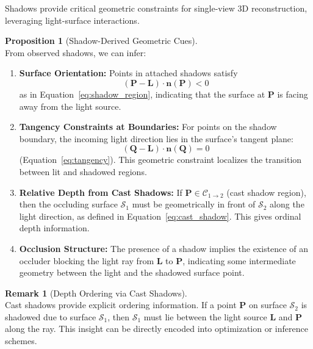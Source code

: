 \documentclass[12pt]{article}
\newcommand{\vect}[1]{\bm{#1}}
\theoremstyle{definition}
\newtheorem{proposition}{Proposition}[subsection]
\newtheorem{remark}{Remark}[subsection]
\begin{document}
Shadows provide critical geometric constraints for single-view 3D reconstruction, leveraging light-surface interactions.

\begin{proposition}[Shadow-Derived Geometric Cues] \label{prop:shadow_cues} ~\\
From observed shadows, we can infer:
\begin{enumerate}[label=(\roman*)]
    \item \textbf{Surface Orientation:} Points in attached shadows satisfy
    \[
    (\vect{P} - \vect{L}) \cdot \vect{n}(\vect{P}) < 0
    \]
    as in Equation~\eqref{eq:shadow_region}, indicating that the surface at $\vect{P}$ is facing away from the light source.

    \item \textbf{Tangency Constraints at Boundaries:} For points on the shadow boundary, the incoming light direction lies in the surface's tangent plane:
    \[
    (\vect{Q} - \vect{L}) \cdot \vect{n}(\vect{Q}) = 0
    \]
    (Equation~\eqref{eq:tangency}). This geometric constraint localizes the transition between lit and shadowed regions.

    \item \textbf{Relative Depth from Cast Shadows:} If $\vect{P} \in \mathcal{C}_{1 \to 2}$ (cast shadow region), then the occluding surface $\mathcal{S}_1$ must be geometrically in front of $\mathcal{S}_2$ along the light direction, as defined in Equation~\eqref{eq:cast_shadow}. This gives ordinal depth information.

    \item \textbf{Occlusion Structure:} The presence of a shadow implies the existence of an occluder blocking the light ray from $\vect{L}$ to $\vect{P}$, indicating some intermediate geometry between the light and the shadowed surface point.
\end{enumerate}
\end{proposition}

\begin{remark}[Depth Ordering via Cast Shadows] \label{rmk:depth_order} ~\\
Cast shadows provide explicit ordering information. If a point $\vect{P}$ on surface $\mathcal{S}_2$ is shadowed due to surface $\mathcal{S}_1$, then $\mathcal{S}_1$ must lie between the light source $\vect{L}$ and $\vect{P}$ along the ray. This insight can be directly encoded into optimization or inference schemes.
\end{remark}
\end{document}

